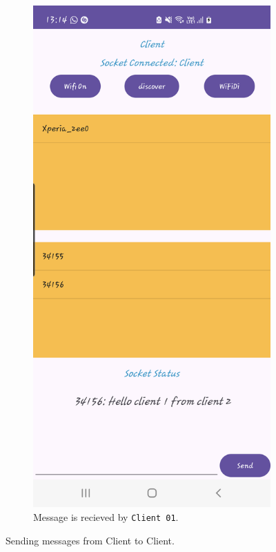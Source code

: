 \begin{figure}
\begin{subfigure}[b]{0.3\textwidth}
        \includegraphics[width=\textwidth,
            height=0.4\textheight]{imgs/client2client-client1.png}
        \caption{Message is recieved by \texttt{Client 01}.}
        \label{c2c:2}
    \end{subfigure}
    \caption{Sending messages from Client to Client.}
    \label{c2c}
\end{figure}

